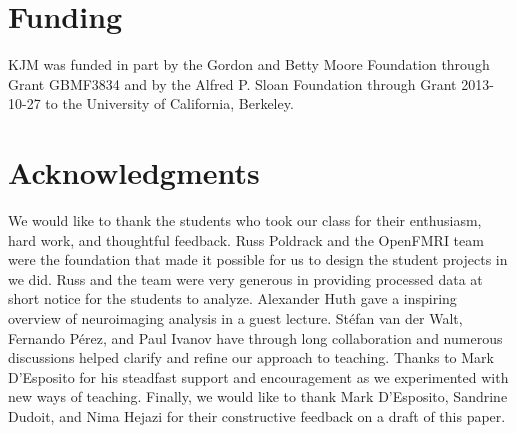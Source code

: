 \documentclass[utf8]{frontiersSCNS} %
\begin{document}



\section*{Funding}

KJM was funded in part by the Gordon and Betty Moore Foundation through Grant
GBMF3834 and by the Alfred P. Sloan Foundation through Grant 2013-10-27 to the
University of California, Berkeley.

\section*{Acknowledgments}
We would like to thank the students who took our class for their enthusiasm,
hard work, and thoughtful feedback.  Russ Poldrack and the OpenFMRI team
were the foundation that made it possible for us to design the student
projects in we did. Russ and the team were very generous in providing
processed data at short notice for the students to analyze.  Alexander Huth
gave a inspiring overview of neuroimaging analysis in a guest lecture.
St{\'e}fan van der Walt, Fernando P{\'e}rez, and Paul Ivanov have through long
collaboration and numerous discussions helped clarify and refine our approach
to teaching.  Thanks to Mark D'Esposito for his steadfast support and
encouragement as we experimented with new ways of teaching.
Finally, we would like to thank Mark D'Esposito, Sandrine Dudoit, and
Nima Hejazi for their constructive feedback on a draft of this paper.




%
\end{document}
